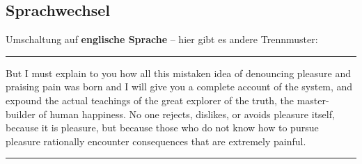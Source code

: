 
\subsection[Sprachwechsel]{Sprachwechsel}

Umschaltung auf \textbf{englische Sprache} -- hier gibt es \ua andere Trennmuster:


\hrule
{}
But I must explain to you how all this mistaken idea of denouncing pleasure and praising pain was born and I will give you a complete account of the system, and expound the actual teachings of the great explorer of the truth, the master-builder of human happiness. No one rejects, dislikes, or avoids pleasure itself, because it is pleasure, but because those who do not know how to pursue pleasure rationally encounter consequences that are extremely painful.
\hrule